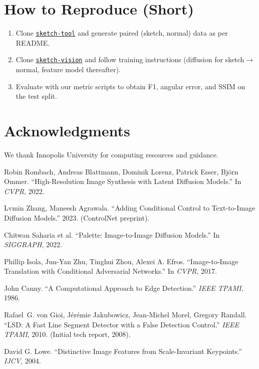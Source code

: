 \documentclass[11pt,a4paper]{article}
\begin{document}
\section{How to Reproduce (Short)}
\begin{enumerate}[leftmargin=*]
  \item Clone \href{https://github.com/touch-topnotch/sketch-tool}{\texttt{sketch-tool}} and generate paired (sketch, normal) data as per README.
  \item Clone \href{https://github.com/touch-topnotch/sketch-vision}{\texttt{sketch-vision}} and follow training instructions (diffusion for sketch$\rightarrow$normal, feature model thereafter).
  \item Evaluate with our metric scripts to obtain F1, angular error, and SSIM on the test split.
\end{enumerate}

\section*{Acknowledgments}
We thank Innopolis University for computing resources and guidance.

\begin{thebibliography}{9}
Robin Rombach, Andreas Blattmann, Dominik Lorenz, Patrick Esser, Björn Ommer. ``High-Resolution Image Synthesis with Latent Diffusion Models.'' In \emph{CVPR}, 2022.

Lvmin Zhang, Maneesh Agrawala. ``Adding Conditional Control to Text-to-Image Diffusion Models.'' 2023. (ControlNet preprint).

Chitwan Saharia et al. ``Palette: Image-to-Image Diffusion Models.'' In \emph{SIGGRAPH}, 2022.

Phillip Isola, Jun-Yan Zhu, Tinghui Zhou, Alexei A. Efros. ``Image-to-Image Translation with Conditional Adversarial Networks.'' In \emph{CVPR}, 2017.

John Canny. ``A Computational Approach to Edge Detection.'' \emph{IEEE TPAMI}, 1986.

Rafael~G. von Gioi, Jérémie Jakubowicz, Jean-Michel Morel, Gregory Randall. ``LSD: A Fast Line Segment Detector with a False Detection Control.'' \emph{IEEE TPAMI}, 2010. (Initial tech report, 2008).

David G. Lowe. ``Distinctive Image Features from Scale-Invariant Keypoints.'' \emph{IJCV}, 2004.
\end{thebibliography}
\end{document}
